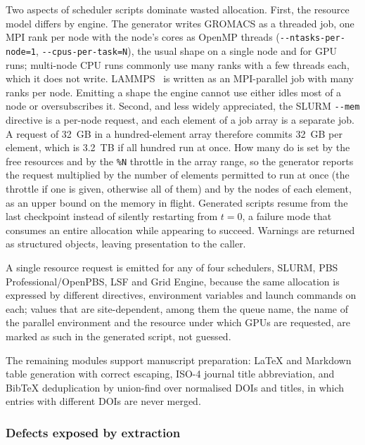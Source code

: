 \documentclass[11pt,a4paper]{article}
\begin{document}
Two aspects of scheduler scripts dominate wasted allocation. First, the resource
model differs by engine. The generator writes GROMACS as a threaded job, one MPI
rank per node with the node's cores as OpenMP threads
(\texttt{-{}-ntasks-per-node=1}, \texttt{-{}-cpus-per-task=N}), the usual shape on
a single node and for GPU runs; multi-node CPU runs commonly use many ranks with
a few threads each, which it does not write. LAMMPS~\cite{thompson2022} is
written as an MPI-parallel job with many ranks per node. Emitting a shape the
engine cannot use either idles most of a node or oversubscribes it.
Second, and less widely appreciated, the SLURM \texttt{-{}-mem} directive is a
per-node request, and each element of a job array is a separate job. A request
of 32~GB in a hundred-element array therefore commits 32~GB per element, which
is 3.2~TB if all hundred run at once. How many do is set by the free resources
and by the \texttt{\%N} throttle in the array range, so the generator reports the
request multiplied by the number of elements permitted to run at once (the throttle if one is given, otherwise all of them) and by the nodes of each element, as an upper bound on the memory in flight. Generated scripts resume from the last checkpoint instead of
silently restarting from $t = 0$, a failure mode that consumes an entire
allocation while appearing to succeed. Warnings are returned as structured
objects, leaving presentation to the caller.

A single resource request is emitted for any of four schedulers, SLURM, PBS
Professional/OpenPBS, LSF and Grid Engine, because the same allocation is
expressed by different directives, environment variables and launch commands on
each; values that are site-dependent, among them the queue name, the name of
the parallel environment and the resource under which GPUs are requested, are
marked as such in the generated script, not guessed.

The remaining modules support manuscript preparation: LaTeX and Markdown
table generation with correct escaping, ISO-4 journal title abbreviation, and
BibTeX deduplication by union-find over normalised DOIs and titles, in which
entries with different DOIs are never merged.

\subsubsection{Defects exposed by extraction}
\label{sec:defects}
\end{document}
